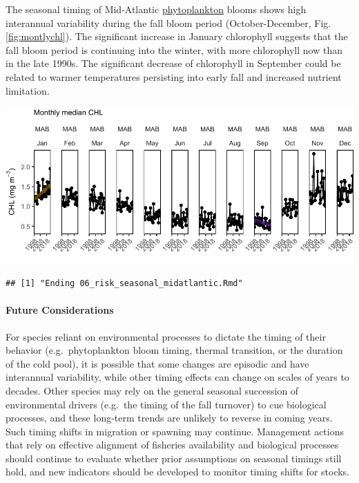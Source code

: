 \documentclass[
  10pt,
]{article}
\let\origfigure\figure
\let\endorigfigure\endfigure
\renewenvironment{figure}[1][2] {
    \expandafter\origfigure\expandafter[H]
} {
    \endorigfigure
}
\begin{document}
The seasonal timing of Mid-Atlantic \href{https://noaa-edab.github.io/catalog/chl_pp.html}{phytoplankton} blooms shows high interannual variability during the fall bloom period (October-December, Fig. \ref{fig:montlychl}). The significant increase in January chlorophyll suggests that the fall bloom period is continuing into the winter, with more chlorophyll now than in the late 1990s. The significant decrease of chlorophyll in September could be related to warmer temperatures persisting into early fall and increased nutrient limitation.

\begin{figure}

{\centering \includegraphics{midatlantic_files/figure-latex/montlychl-1} 

}

\caption{Monthly median chlorophyll a concentration in the MAB (black) with significant increase in January (orange line) and decrease in September (purple line).}\label{fig:montlychl}
\end{figure}

\begin{verbatim}
## [1] "Ending 06_risk_seasonal_midatlantic.Rmd"
\end{verbatim}

\paragraph{Future Considerations}\label{future-considerations-1}

For species reliant on environmental processes to dictate the timing of their behavior (e.g.~phytoplankton bloom timing, thermal transition, or the duration of the cold pool), it is possible that some changes are episodic and have interannual variability, while other timing effects can change on scales of years to decades. Other species may rely on the general seasonal succession of environmental drivers (e.g.~the timing of the fall turnover) to cue biological processes, and these long-term trends are unlikely to reverse in coming years. Such timing shifts in migration or spawning may continue. Management actions that rely on effective alignment of fisheries availability and biological processes should continue to evaluate whether prior assumptions on seasonal timings still hold, and new indicators should be developed to monitor timing shifts for stocks.
\end{document}
